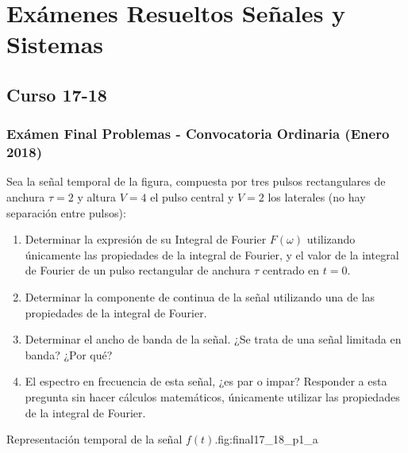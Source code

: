 \chapter{Exámenes Resueltos Señales y Sistemas}
\estiloExamen 

\section{Curso 17-18}

\subsection{Exámen Final Problemas - Convocatoria Ordinaria (Enero 2018)}

\begin{problema}
Sea la señal temporal de la figura, compuesta por tres pulsos rectangulares de anchura $\tau=2$ y altura $V=4$ el pulso central y $V=2$ los laterales (no hay separación entre pulsos):


\begin{enumerate}[label=\alph*)]
    \item Determinar la expresión de su Integral de Fourier $F(\omega)$ utilizando únicamente las propiedades de la integral de Fourier, y el valor de la integral de Fourier de un pulso rectangular de anchura $\tau$ centrado en $t=0$.
    \item Determinar la componente de continua de la señal utilizando una de las propiedades de la integral de Fourier.
    \item Determinar el ancho de banda de la señal. ¿Se trata de una señal limitada en banda? ¿Por qué?
    \item El espectro en frecuencia de esta señal, ¿es par o impar? Responder a esta pregunta sin hacer cálculos matemáticos, únicamente utilizar las propiedades de la integral de Fourier.
\end{enumerate}
\end{problema}

%
         {Representación temporal de la señal $f(t)$.}{fig:final17_18_p1_a}

